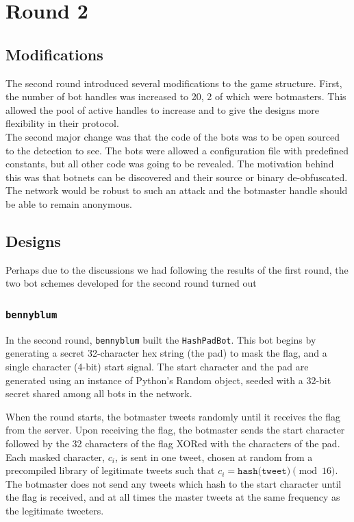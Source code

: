 \documentclass[11pt, oneside]{article} %
\numberwithin{equation}{section} %
\numberwithin{figure}{section} %
\numberwithin{table}{section} %
\renewcommand{\c}[1]{\texttt{#1}}
\newcommand{\teambb}{\c{bennyblum}}
\begin{document}
\section{Round 2}
	\subsection{Modifications}
		The second round introduced several modifications to the game structure. First, the number of bot handles was increased to 20, 2 of which were botmasters. This allowed the pool of active handles to increase and to give the designs more flexibility in their protocol. \\

		The second major change was that the code of the bots was to be open sourced to the detection to see. The bots were allowed a configuration file with predefined constants, but all other code was going to be revealed. The motivation behind this was that botnets can be discovered and their source or binary de-obfuscated. The network would be robust to such an attack and the botmaster handle should be able to remain anonymous. \\

		
	\subsection{Designs}
        Perhaps due to the discussions we had following the results of the first round, the two bot schemes developed for the second round turned out 
		\subsubsection{\teambb{}}
        	In the second round, \teambb{} built the \c{HashPadBot}. This bot begins by generating a secret 32-character hex string (the pad) to mask the flag, and a single character (4-bit) start signal. The start character and the pad are generated using an instance of Python's Random object, seeded with a 32-bit secret shared among all bots in the network.
        	
            When the round starts, the botmaster tweets randomly until it receives the flag from the server. Upon receiving the flag, the botmaster sends the start character followed by the 32 characters of the flag XORed with the characters of the pad. Each masked character, $c_i$, is sent in one tweet, chosen at random from a precompiled library of legitimate tweets such that $c_i = \texttt{hash(tweet)} \pmod{16}$. The botmaster does not send any tweets which hash to the start character until the flag is received, and at all times the master tweets at the same frequency as the legitimate tweeters.
        	
\end{document}
